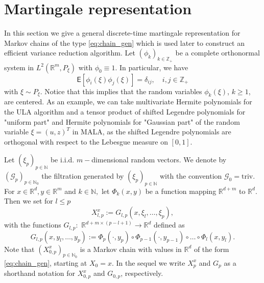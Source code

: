 \documentclass[bj]{imsart}
\def\nset{\mathbb{N}}
\def\rset{\mathbb{R}}
\def\rset{\mathbb{R}}
\begin{document}
\section{Martingale representation}
\label{seq:mart_repr}
In this section we give a general discrete-time martingale representation for  Markov chains of the type  \eqref{eq:chain_gen} which is  used later to construct an efficient variance reduction algorithm. Let \((\phi_k)_{k\in \mathbb{Z}_+}\) be a complete orthonormal system in \(L^2(\mathbb{R}^m, P_{\xi})\) with \(\phi_0\equiv 1\).  In particular, we have
\begin{equation*}
\mathsf{E}[\phi_i(\xi)\phi_j(\xi)]=\delta_{ij},\quad i,j\in  \mathbb{Z}_{+}
\end{equation*}
with \(\xi \sim P_{\xi}.\)
Notice that this implies that the random variables
$\phi_k(\xi)$, $k\ge1$, are centered. As an example, we can take  multivariate Hermite polynomials for the ULA algorithm and a tensor product of shifted Legendre polynomials for "uniform part" and Hermite polynomials for "Gaussian part"  of the random variable $\xi = (u, z)^T$ in MALA, as the shifted Legendre polynomials are orthogonal with respect to the Lebesgue measure on \([0,1].\)
\par
Let  $(\xi_p)_{p \in \nset}$ be i.i.d. $m-$dimensional random vectors. We denote by $(\mathcal{G}_p)_{p \in \nset_0}$  the filtration generated by $(\xi_p)_{p \in \nset}$ with the convention $\mathcal{G}_0=\mathrm{triv}$. For  $x \in \rset^d, y \in \rset^{m}$ and $k \in \nset,$ let $\Phi_k(x,y)$ be a function mapping $\rset^{d+m}$ to $\rset^d$. Then we set for $l \le p$
\begin{equation}
\label{eq:ula_new}
X^x_{l,p}:=G_{l,p}(x,\xi_{l},\ldots,\xi_{p}),
\end{equation}
with the functions \(G_{l,p}:\) \(\rset^{d + m\times(p-l+1)}\to \rset^{d}\) defined as
\begin{equation}
\label{eq:definition-G-p-l}
G_{l,p}(x,y_l,\ldots,y_p):=\Phi_p(\cdot,y_{p})\circ\Phi_{p-1}(\cdot,y_{p-1})\circ\dots\circ\Phi_{l}(x,y_{l}).
\end{equation}
Note that $\left(X^x_{0,p}\right)_{p \in \nset_0}$ is a Markov chain with values in $\rset^d$ of the form \eqref{eq:chain_gen}, starting at $X_0 = x$. In the sequel we write $X^x_{p}$ and $G_{p}$ as a shorthand notation for $X^x_{0,p}$ and $G_{0,p}$, respectively.
\end{document}
